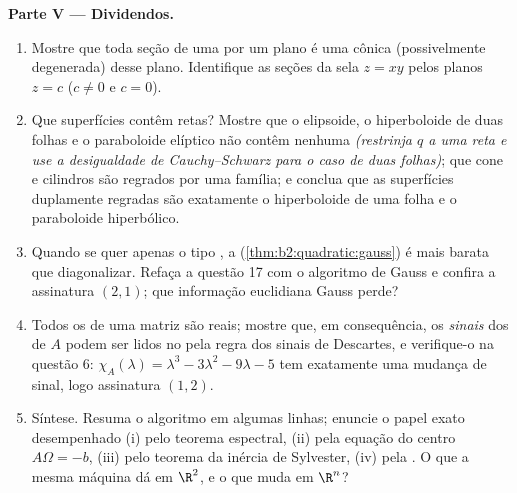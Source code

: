 \begin{problem}
\medskip
\noindent\textbf{Parte V --- Dividendos.}
\begin{enumerate}[resume]
  \item Mostre que toda seção de uma  por um plano
         é uma cônica (possivelmente degenerada) desse plano.
        Identifique as seções da sela $z = xy$ pelos
        planos $z = c$ ($c \neq 0$ e $c = 0$).
  \item Que superfícies  contêm retas? Mostre
        que o elipsoide, o hiperboloide de duas folhas e o
        paraboloide elíptico não contêm nenhuma \emph{(restrinja $q$
        a uma reta e use a desigualdade de Cauchy--Schwarz para
        o caso de duas folhas)}; que cone e cilindros são
        regrados por uma família; e conclua que as superfícies
         duplamente regradas são exatamente o hiperboloide
        de uma folha e o paraboloide hiperbólico.
  \item Quando se quer apenas o tipo \emph{}, a
         (\cref{thm:b2:quadratic:gauss}) é mais barata
        que diagonalizar. Refaça a questão 17 com o algoritmo
        de Gauss e confira a assinatura $(2, 1)$; que
        informação euclidiana Gauss perde?
  \item Todos os  de uma matriz  são reais; mostre
        que, em consequência, os \emph{sinais} dos 
        de $A$ podem ser lidos no 
        pela regra dos sinais de Descartes, e verifique-o na
        questão 6: $\chi_A(\lambda) = \lambda^3 - 3\lambda^2
        - 9\lambda - 5$ tem exatamente uma mudança de sinal, logo
        assinatura $(1, 2)$.
  \item Síntese. Resuma o algoritmo em algumas linhas;
        enuncie o papel exato desempenhado (i) pelo teorema
        espectral, (ii) pela equação do centro $A\Omega = -b$,
        (iii) pelo teorema da inércia de Sylvester, (iv) pela . O que a mesma máquina dá em
        $\R^2$, e o que muda em $\R^n$?
\end{enumerate}
\end{problem}
